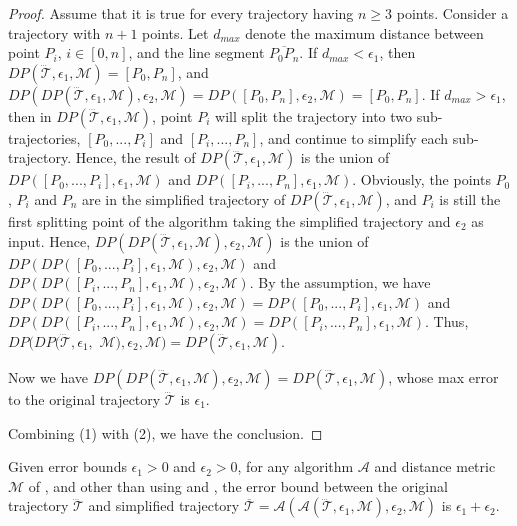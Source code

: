 \begin{proof}
	\item Assume that it is true for every trajectory  having $n \ge 3$ points.
	Consider a trajectory with $n+1$ points. Let $d_{max}$ denote the maximum distance between point $P_i$, $i \in [0,n]$, and the line segment $\overline{P_0P_{n}}$.
	If $d_{max}<\epsilon_1$, then $DP(\dddot{\mathcal{T}}, \epsilon_1, \mathcal{M})=[P_0, P_{n}]$, and $DP(DP(\dddot{\mathcal{T}}, \epsilon_1, \mathcal{M}), \epsilon_2, \mathcal{M}) = DP([P_0, P_{n}], \epsilon_2, \mathcal{M})=[P_0, P_{n}]$.
	If $d_{max} > \epsilon_1$, then in $DP(\dddot{\mathcal{T}}, \epsilon_1, \mathcal{M})$, point $P_i$ will split the trajectory  into two sub-trajectories, \ie $[P_0, ..., P_i]$ and $[P_{i}, ..., P_{n}]$, and continue to simplify each sub-trajectory. Hence, the result of $DP(\dddot{\mathcal{T}}, \epsilon_1, \mathcal{M})$ is the union of $DP([P_0, ..., P_i], \epsilon_1, \mathcal{M})$ and $DP([P_i, ..., P_n], \epsilon_1, \mathcal{M})$.
	Obviously, the points $P_0$, $P_i$ and $P_n$ are in the simplified trajectory of $DP(\dddot{\mathcal{T}}, \epsilon_1, \mathcal{M})$, and $P_i$ is still the first splitting point of the \dpa algorithm taking the simplified trajectory and $\epsilon_2$ as input. Hence, $DP(DP(\dddot{\mathcal{T}}, \epsilon_1, \mathcal{M}), \epsilon_2, \mathcal{M})$ is the union of $DP(DP([P_0, ..., P_i], \epsilon_1, \mathcal{M}), \epsilon_2, \mathcal{M})$ and $DP(DP([P_i, ..., P_n], \epsilon_1, \mathcal{M}), \epsilon_2, \mathcal{M})$. By the assumption, we have $DP(DP([P_0, ..., P_i], \epsilon_1, \mathcal{M}), \epsilon_2, \mathcal{M}) = DP([P_0, ..., P_i], \epsilon_1, \mathcal{M})$ and $DP(DP([P_i, ..., P_n], \epsilon_1, \mathcal{M}), \epsilon_2, \mathcal{M}) = DP([P_i, ..., P_n], \epsilon_1, \mathcal{M})$. Thus, $DP(DP(\dddot{\mathcal{T}}, \epsilon_1,$ $\mathcal{M}), \epsilon_2, \mathcal{M}) = DP(\dddot{\mathcal{T}}, \epsilon_1, \mathcal{M})$.

\item  Now we have $DP(DP(\dddot{\mathcal{T}}, \epsilon_1, \mathcal{M}), \epsilon_2, \mathcal{M}) = DP(\dddot{\mathcal{T}}, \epsilon_1, \mathcal{M})$, whose max error to the original trajectory $\dddot{\mathcal{T}}$ is $\epsilon_1$.
\ei

Combining (1) with (2), we have the conclusion.
\end{proof}


\begin{proposition}
	\label{theo-aging-distance}
	Given error bounds $\epsilon_1>0$ and $\epsilon_2>0$, for any \lsa algorithm $\mathcal{A}$ and distance metric $\mathcal{M}$ of \ped, \sed and \dad other than \dpa using \ped and \sed, the error bound between the original trajectory $\dddot{\mathcal{T}}$ and simplified trajectory $\overline{\mathcal{T}}=\mathcal{A}(\mathcal{A}(\dddot{\mathcal{T}}, \epsilon_1, \mathcal{M}), \epsilon_2, \mathcal{M})$ is $\epsilon_1+ \epsilon_2$.
\end{proposition}

